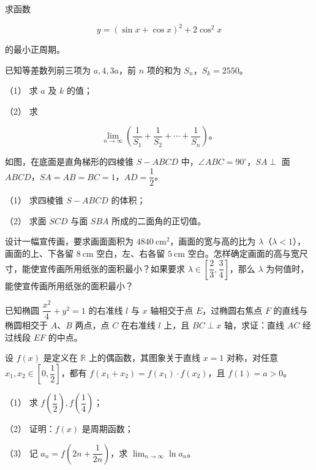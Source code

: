 \begin{question}
求函数

\nopagebreak[4]
\[
y=(\sin x+\cos x)^2+2\cos^2x
\]

的最小正周期。

\end{question}
\begin{question}
已知等差数列前三项为 $a,4,3a$，前 $n$ 项的和为 $S_n$，$S_k=2550$。

（1） 求 $a$ 及 $k$ 的值；

（2） 求

\nopagebreak[4]
\[
\lim_{n\to\infty}\left(\frac1{S_1}+\frac1{S_2}+\cdots+\frac1{S_n}\right)。
\]

\Needspace{0.4\textheight}
\end{question}
\begin{question}
如图，在底面是直角梯形的四棱锥 $S-ABCD$ 中，$\angle ABC=90^\circ$，$SA\perp$ 面 $ABCD$，$SA=AB=BC=1$，$AD=\dfrac12$。
\nopagebreak[4]
\begin{center}\end{center}
\nopagebreak[4]
（1） 求四棱锥 $S-ABCD$ 的体积；

（2） 求面 $SCD$ 与面 $SBA$ 所成的二面角的正切值。

\end{question}
\begin{question}
设计一幅宣传画，要求画面面积为 $4840\ \mathrm{cm}^2$，画面的宽与高的比为 $\lambda$（$\lambda<1$），画面的上、下各留 $8\ \mathrm{cm}$ 空白，左、右各留 $5\ \mathrm{cm}$ 空白。怎样确定画面的高与宽尺寸，能使宣传画所用纸张的面积最小？如果要求 $\lambda\in\left[\dfrac23,\dfrac34\right]$，那么 $\lambda$ 为何值时，能使宣传画所用纸张的面积最小？

\end{question}
\begin{question}
已知椭圆 $\dfrac{x^2}{4}+y^2=1$ 的右准线 $l$ 与 $x$ 轴相交于点 $E$，过椭圆右焦点 $F$ 的直线与椭圆相交于 $A\text{、}B$ 两点，点 $C$ 在右准线 $l$ 上，且 $BC\perp x$ 轴，求证：直线 $AC$ 经过线段 $EF$ 的中点。

\end{question}
\begin{question}
设 $f(x)$ 是定义在 $\mathbb R$ 上的偶函数，其图象关于直线 $x=1$ 对称，对任意 $x_1,x_2\in\left[0,\dfrac12\right]$，都有 $f(x_1+x_2)=f(x_1)\cdot f(x_2)$，且 $f(1)=a>0$。

（1） 求 $f\left(\dfrac12\right),f\left(\dfrac14\right)$；

（2） 证明：$f(x)$ 是周期函数；

（3） 记 $a_n=f\left(2n+\dfrac1{2n}\right)$，求 $\displaystyle\lim_{n\to\infty}\ln a_n$。

\end{question}